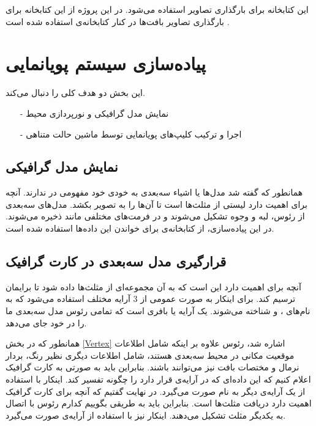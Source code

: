 این کتابخانه برای بارگذاری تصاویر استفاده می‌شود. در این پروژه از این کتابخانه برای بارگذاری
تصاویر بافت‌ها در کنار کتابخانه‌ی 
استفاده شده است \cite{stb}.


\section{پیاده‌سازی سیستم پویانمایی}

این بخش دو هدف کلی را دنبال می‌کند.

\begin{enumerate}
	\item[-] نمایش مدل گرافیکی و نورپردازی محیط
	\item[-] اجرا و ترکیب کلیپ‌های پویانمایی توسط ماشین حالت متناهی

\end{enumerate}

\subsection{نمایش مدل گرافیکی}

همانطور که گفته شد مدل‌ها یا اشیاء سه‌بعدی به خودی خود مفهومی در 
ندارند. آنچه برای 
اهمیت دارد لیستی از مثلث‌ها است تا آن‌ها را به تصویر بکشد.
مدل‌های سه‌بعدی از رئوس، لبه و وجوه تشکیل می‌شوند و در فرمت‌های مختلفی مانند
ذخیره می‌شوند. در این پیا‌ده‌سازی، از کتابخانه‌ی 
برای خواندن این داده‌ها استفاده شده است.

\subsection{قرارگیری مدل سه‌بعدی در کارت گرافیک}

آنچه برای 
 اهمیت دارد این است که به آن مجموعه‌ای از مثلث‌ها داده شود تا برایمان ترسیم کند.
برای اینکار به صورت عمومی از 3 آرایه مختلف استفاده می‌شود که به نام‌های 
،
و 
شناخته می‌شوند.
یک آرایه یا بافری است که تمامی رئوس مدل سه‌بعدی ما را در خود جای می‌دهد.

همانطور که در بخش
\ref{Vertex}
اشاره شد، رئوس علاوه بر اینکه شامل اطلاعات موقعیت مکانی در محیط سه‌بعدی هستند، شامل اطلاعات دیگری 
نظیر رنگ، بردار نرمال و مختصات بافت نیز می‌توانند باشند. بنابراین باید به صورتی به کارت گرافیک 
اعلام کنیم که این داده‌ای که در آرایه‌ی 
قرار دارد را چگونه تفسیر کند.
اینکار با استفاده از یک آرایه‌ی دیگر به نام 
صورت می‌گیرد.
در نهایت گفتیم که آنچه برای کارت گرافیک اهمیت دارد دریافت مثلث‌ها است. بنابراین باید به طریقی بگوییم کدارم رئوس با 
اتصال به یکدیگر مثلث تشکیل می‌دهند. اینکار نیز با استفاده از آرایه‌ی 
صورت می‌گیرد.

